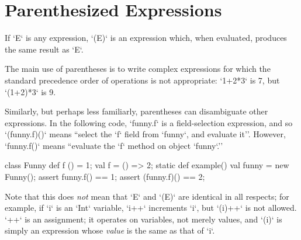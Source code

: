 \section{Parenthesized Expressions}

If \xcd`E` is any expression, \xcd`(E)` is an expression which, when
evaluated, produces the same result as \xcd`E`.   

\begin{ex}
The main use of parentheses is to write complex expressions for which the 
standard precedence order of operations is not appropriate: \xcd`1+2*3` is 7,
but \xcd`(1+2)*3` is 9.  

Similarly, but perhaps less familiarly, 
parentheses can disambiguate other expressions.  In the following code, 
\xcd`funny.f` is a field-selection expression, and so \xcd`(funny.f)()` means
``select the \xcd`f` field from \xcd`funny`, and evaluate it''.  However, 
\xcd`funny.f()` means ``evaluate the \xcd`f` method on object \xcd`funny`.''  
\begin{xten}
class Funny {
  def f () = 1;
  val f = () => 2;
  static def example() {
    val funny = new Funny();
    assert funny.f() == 1;
    assert (funny.f)() == 2;
  }
}
\end{xten}


\end{ex}

Note that this does {\em
not} mean that \xcd`E` and \xcd`(E)` are identical in all respects; for
example, if \xcd`i` is an \xcd`Int` variable, \xcd`i++` increments \xcd`i`,
but \xcd`(i)++` is not allowed.    \xcd`++` is an assignment; it operates on
variables, not merely values, and \xcd`(i)` is simply an expression whose {\em
value} is the same as that of \xcd`i`. 
